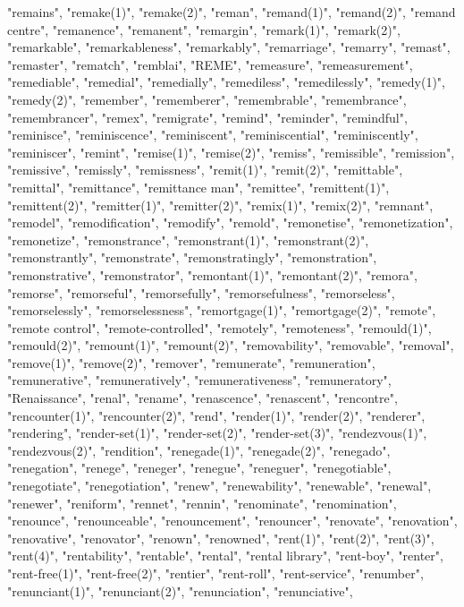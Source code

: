"remains",
"remake(1)",
"remake(2)",
"reman",
"remand(1)",
"remand(2)",
"remand centre",
"remanence",
"remanent",
"remargin",
"remark(1)",
"remark(2)",
"remarkable",
"remarkableness",
"remarkably",
"remarriage",
"remarry",
"remast",
"remaster",
"rematch",
"remblai",
"REME",
"remeasure",
"remeasurement",
"remediable",
"remedial",
"remedially",
"remediless",
"remedilessly",
"remedy(1)",
"remedy(2)",
"remember",
"rememberer",
"remembrable",
"remembrance",
"remembrancer",
"remex",
"remigrate",
"remind",
"reminder",
"remindful",
"reminisce",
"reminiscence",
"reminiscent",
"reminiscential",
"reminiscently",
"reminiscer",
"remint",
"remise(1)",
"remise(2)",
"remiss",
"remissible",
"remission",
"remissive",
"remissly",
"remissness",
"remit(1)",
"remit(2)",
"remittable",
"remittal",
"remittance",
"remittance man",
"remittee",
"remittent(1)",
"remittent(2)",
"remitter(1)",
"remitter(2)",
"remix(1)",
"remix(2)",
"remnant",
"remodel",
"remodification",
"remodify",
"remold",
"remonetise",
"remonetization",
"remonetize",
"remonstrance",
"remonstrant(1)",
"remonstrant(2)",
"remonstrantly",
"remonstrate",
"remonstratingly",
"remonstration",
"remonstrative",
"remonstrator",
"remontant(1)",
"remontant(2)",
"remora",
"remorse",
"remorseful",
"remorsefully",
"remorsefulness",
"remorseless",
"remorselessly",
"remorselessness",
"remortgage(1)",
"remortgage(2)",
"remote",
"remote control",
"remote-controlled",
"remotely",
"remoteness",
"remould(1)",
"remould(2)",
"remount(1)",
"remount(2)",
"removability",
"removable",
"removal",
"remove(1)",
"remove(2)",
"remover",
"remunerate",
"remuneration",
"remunerative",
"remuneratively",
"remunerativeness",
"remuneratory",
"Renaissance",
"renal",
"rename",
"renascence",
"renascent",
"rencontre",
"rencounter(1)",
"rencounter(2)",
"rend",
"render(1)",
"render(2)",
"renderer",
"rendering",
"render-set(1)",
"render-set(2)",
"render-set(3)",
"rendezvous(1)",
"rendezvous(2)",
"rendition",
"renegade(1)",
"renegade(2)",
"renegado",
"renegation",
"renege",
"reneger",
"renegue",
"reneguer",
"renegotiable",
"renegotiate",
"renegotiation",
"renew",
"renewability",
"renewable",
"renewal",
"renewer",
"reniform",
"rennet",
"rennin",
"renominate",
"renomination",
"renounce",
"renounceable",
"renouncement",
"renouncer",
"renovate",
"renovation",
"renovative",
"renovator",
"renown",
"renowned",
"rent(1)",
"rent(2)",
"rent(3)",
"rent(4)",
"rentability",
"rentable",
"rental",
"rental library",
"rent-boy",
"renter",
"rent-free(1)",
"rent-free(2)",
"rentier",
"rent-roll",
"rent-service",
"renumber",
"renunciant(1)",
"renunciant(2)",
"renunciation",
"renunciative",
